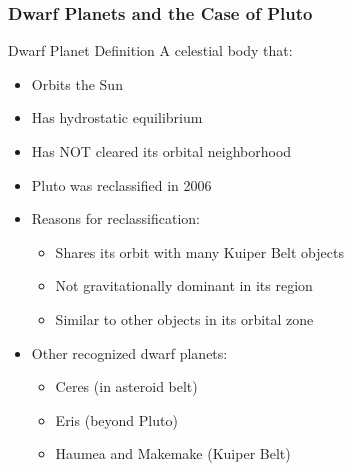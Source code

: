 \documentclass{beamer}
\begin{document}
\begin{frame}
\frametitle{Dwarf Planets and the Case of Pluto}

\begin{block}{Dwarf Planet Definition}
A celestial body that:
\begin{itemize}
    \item Orbits the Sun
    \item Has hydrostatic equilibrium
    \item Has NOT cleared its orbital neighborhood
\end{itemize}
\end{block}

\begin{itemize}
    \item Pluto was reclassified in 2006
    \item Reasons for reclassification:
    \begin{itemize}
        \item Shares its orbit with many Kuiper Belt objects
        \item Not gravitationally dominant in its region
        \item Similar to other objects in its orbital zone
    \end{itemize}
    \item Other recognized dwarf planets:
    \begin{itemize}
        \item Ceres (in asteroid belt)
        \item Eris (beyond Pluto)
        \item Haumea and Makemake (Kuiper Belt)
    \end{itemize}
\end{itemize}

\end{frame}
\end{document}

